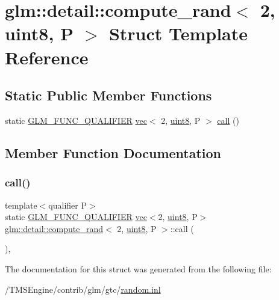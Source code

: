 \hypertarget{structglm_1_1detail_1_1compute__rand_3_012_00_01uint8_00_01_p_01_4}{}\section{glm\+:\+:detail\+:\+:compute\+\_\+rand$<$ 2, uint8, P $>$ Struct Template Reference}
\label{structglm_1_1detail_1_1compute__rand_3_012_00_01uint8_00_01_p_01_4}
\subsection*{Static Public Member Functions}
\begin{DoxyCompactItemize}
\item 
static \hyperlink{setup_8hpp_a33fdea6f91c5f834105f7415e2a64407}{G\+L\+M\+\_\+\+F\+U\+N\+C\+\_\+\+Q\+U\+A\+L\+I\+F\+I\+ER} \hyperlink{structglm_1_1vec}{vec}$<$ 2, \hyperlink{namespaceglm_1_1detail_aef2588f97d090cc19fbbe0c74fe17c8f}{uint8}, P $>$ \hyperlink{structglm_1_1detail_1_1compute__rand_3_012_00_01uint8_00_01_p_01_4_a4fb277fdbfbcf3fa064f1694a9a9ac1a}{call} ()
\end{DoxyCompactItemize}


\subsection{Member Function Documentation}
\mbox{\label{structglm_1_1detail_1_1compute__rand_3_012_00_01uint8_00_01_p_01_4_a4fb277fdbfbcf3fa064f1694a9a9ac1a}} 
\subsubsection{\texorpdfstring{call()}{call()}}
{\footnotesize\ttfamily template$<$qualifier P$>$ \\
static \hyperlink{setup_8hpp_a33fdea6f91c5f834105f7415e2a64407}{G\+L\+M\+\_\+\+F\+U\+N\+C\+\_\+\+Q\+U\+A\+L\+I\+F\+I\+ER} \hyperlink{structglm_1_1vec}{vec}$<$2, \hyperlink{namespaceglm_1_1detail_aef2588f97d090cc19fbbe0c74fe17c8f}{uint8}, P$>$ \hyperlink{structglm_1_1detail_1_1compute__rand}{glm\+::detail\+::compute\+\_\+rand}$<$ 2, \hyperlink{namespaceglm_1_1detail_aef2588f97d090cc19fbbe0c74fe17c8f}{uint8}, P $>$\+::call (\begin{DoxyParamCaption}{ }\end{DoxyParamCaption})\hspace{0.3cm}{\ttfamily [inline]}, {\ttfamily [static]}}



The documentation for this struct was generated from the following file\+:\begin{DoxyCompactItemize}
\item 
/\+T\+M\+S\+Engine/contrib/glm/gtc/\hyperlink{random_8inl}{random.\+inl}\end{DoxyCompactItemize}
